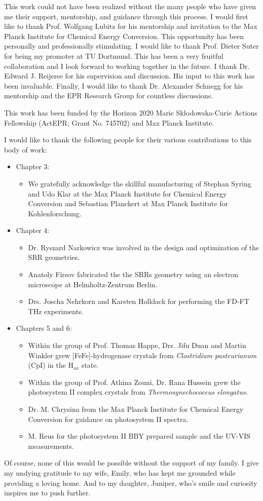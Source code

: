 
This work could not have been realized without the many people who have given me their support, mentorship, and guidance through this process. I would first like to thank Prof. Wolfgang Lubitz for his mentorship and invitation to the Max Planck Institute for Chemical Energy Conversion. This opportunity has been personally and professionally stimulating. I would like to thank Prof. Dieter Suter for being my promoter at TU Dortmund. This has been a very fruitful collaboration and I look forward to working together in the future. I thank Dr. Edward J. Reijerse for his supervision and discussion. His input to this work has been invaluable. Finally, I would like to thank Dr. Alexander Schnegg for his mentorship and the EPR Research Group for countless discussions. 

This work has been funded by the Horizon 2020 Marie Sk\l{}odowska-Curie Actions Fellowship (ActEPR; Grant No. 745702) and Max Planck Institute. 

I would like to thank the following people for their various contributions to this body of work:
\begin{itemize}
    \item Chapter 3: 
    \begin{itemize}
        \item We gratefully acknowledge the skillful manufacturing of Stephan Syring and Udo Klar at the Max Planck Institute for Chemical Energy Conversion and Sebastian Planckert at Max Planck Institute for Kohlenforschung.
    \end{itemize}
    \item Chapter 4:
    \begin{itemize}
        \item Dr. Ryszard Narkowicz was involved in the design and optimization of the SRR geometries. 
        \item Anatoly Firsov fabricated the the SRRs geometry using an electron microscope at Helmholtz-Zentrum Berlin. 
        \item Drs. Joscha Nehrkorn and Karsten Holldack for performing the FD-FT THz experiments.
    \end{itemize}
    \item Chapters 5 and 6:
    \begin{itemize}
        \item Within the group of Prof. Thomas Happe, Drs. Jifu Duan and Martin Winkler grew [FeFe]-hydrogenase crystals from {\em Clostridium pasteurianum} (CpI) in the H$_{ox}$ state.
        \item Within the group of Prof. Athina Zouni, Dr. Rana Hussein grew the photosystem II complex crystals from {\em Thermosynechococcus elongatus}. 
        \item Dr. M. Chrysina from the Max Planck Institute for Chemical Energy Conversion for guidance on photosystem II spectra.
        \item M. Reus for the photosystem II BBY prepared sample and the UV-VIS measurements.     
    \end{itemize}
\end{itemize}

Of course, none of this would be possible without the support of my family. I give my undying gratitude to my wife, Emily, who has kept me grounded while providing a loving home. And to my daughter, Juniper, who's smile and curiosity inspires me to push further.
 